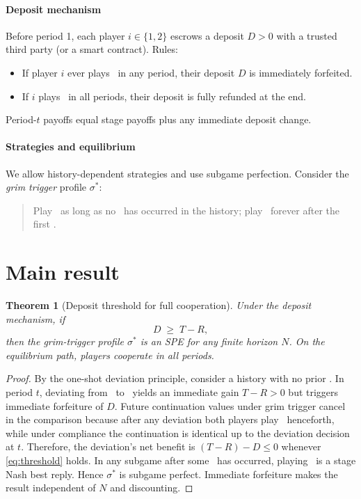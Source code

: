 \documentclass[a4paper,11pt]{article}
\theoremstyle{definition}
\theoremstyle{plain}
\newtheorem{theorem}{Theorem}
\theoremstyle{remark}
\newcommand{\C}{\text{C}} %
\newcommand{\D}{\text{D}} %
\newcommand{\1}{\mathbf{1}}
\begin{document}
\paragraph{Deposit mechanism}
Before period 1, each player $i\in\{1,2\}$ escrows a deposit $D>0$ with a trusted third party (or a smart contract).
Rules:
\begin{itemize}[leftmargin=1.5em]
  \item If player $i$ ever plays \D\ in any period, their deposit $D$ is immediately forfeited.
  \item If $i$ plays \C\ in all periods, their deposit is fully refunded at the end.
\end{itemize}
Period-$t$ payoffs equal stage payoffs plus any immediate deposit change.

\paragraph{Strategies and equilibrium}
We allow history-dependent strategies and use subgame perfection.
Consider the \emph{grim trigger} profile $\sigma^\ast$:
\begin{quote}
Play \C\ as long as no \D\ has occurred in the history; play \D\ forever after the first \D.
\end{quote}

\section{Main result}
\begin{theorem}[Deposit threshold for full cooperation]\label{thm:main}
Under the deposit mechanism, if
\begin{equation}\label{eq:threshold}
D \;\ge\; T - R,
\end{equation}
then the grim-trigger profile $\sigma^\ast$ is an SPE for any finite horizon $N$. On the equilibrium path, players cooperate in all periods.
\end{theorem}

\begin{proof}
By the one-shot deviation principle, consider a history with no prior \D. In period $t$, deviating from \C\ to \D\ yields an immediate gain $T-R>0$ but triggers immediate forfeiture of $D$. 
Future continuation values under grim trigger cancel in the comparison because after any deviation both players play \D\ henceforth, while under compliance the continuation is identical up to the deviation decision at $t$. 
Therefore, the deviation's net benefit is $(T-R)-D\le 0$ whenever \eqref{eq:threshold} holds. In any subgame after some \D\ has occurred, playing \D\ is a stage Nash best reply. Hence $\sigma^\ast$ is subgame perfect. Immediate forfeiture makes the result independent of $N$ and discounting.
\end{proof}
\end{document}
